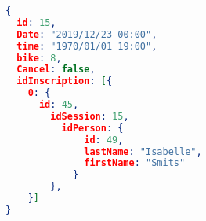 \begin{lstlisting}[language=json,firstnumber=1]
{
  id: 15,
  Date: "2019/12/23 00:00",
  time: "1970/01/01 19:00",
  bike: 8,
  Cancel: false,
  idInscription: [{
  	0: {
  	  id: 45,
		idSession: 15,
		  idPerson: {
			  id: 49,
			  lastName: "Isabelle",
			  firstName: "Smits"
			}
		},
	}]
}
\end{lstlisting}